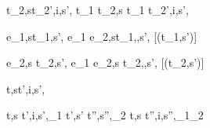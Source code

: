   {t_2,s\symhandle t_2',i,s',\phi }
  {t_1 \Or t_2,s \symhandle t_1 \Or t_2',\Second i,s',\phi}


  {e_1,s\symnormalise t_1,s',\phi}
  {e_1 \Xor e_2,s\symhandle t_1,\Left,s',\phi}
  [\neg\Failing(t_1,s')]

  {e_2,s \symnormalise t_2,s',\phi}
  {e_1 \Xor e_2,s \symhandle t_2,\Right,s',\phi}
  [\neg\Failing(t_2,s')]



  {t,s\symdrive  t',i,s',\phi}


  {t,s \symhandle t',i,s',\phi_1 \Quad
   t',s' \symnormalise t'',s'',\phi_2}
  {t,s \symdrive t'',i,s'',\phi_1\wedge\phi_2}
